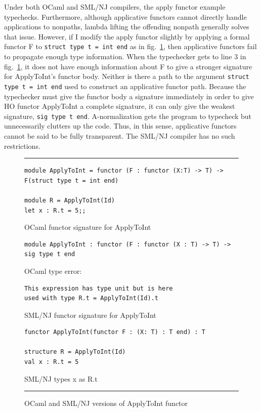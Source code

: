 Under both OCaml and SML/NJ compilers, the apply functor example typechecks. Furthermore, although applicative functors cannot directly handle applications to nonpaths, lambda lifting the offending nonpath generally solves that issue. However, if I modify the apply functor slightly by applying a formal functor F to \lstinline{struct type t = int end} as in fig.~\ref{fig:hoapplyfct}, then applicative functors fail to propagate enough type information. When the typechecker gets to line 3 in fig.~\ref{fig:hoapplyfct}, it does not have enough information about F to give a stronger signature for ApplyToInt's functor body. Neither is there a path to the argument \lstinline{struct type t = int end} used to construct an applicative functor path. Because the typechecker must give the functor body a signature immediately in order to give HO functor ApplyToInt a complete signature, it can only give the weakest signature, \lstinline{sig type t end}. A-normalization gets the program to typecheck but unnecessarily clutters up the code. Thus, in this sense, applicative functors cannot be said to be fully transparent. The SML/NJ compiler has no such restrictions.

\begin{figure}
\hrule
\begin{lstlisting}[style=ocamlcode]
module ApplyToInt = functor (F : functor (X:T) -> T) -> F(struct type t = int end)

module R = ApplyToInt(Id)
let x : R.t = 5;;
\end{lstlisting}

OCaml functor signature for ApplyToInt
\begin{lstlisting}
module ApplyToInt : functor (F : functor (X : T) -> T) -> sig type t end
\end{lstlisting}
OCaml type error:
\begin{verbatim}
This expression has type unit but is here 
used with type R.t = ApplyToInt(Id).t
\end{verbatim}
SML/NJ functor signature for ApplyToInt
\begin{lstlisting}
functor ApplyToInt(functor F : (X: T) : T end) : T

structure R = ApplyToInt(Id)
val x : R.t = 5
\end{lstlisting}
SML/NJ types x as R.t 
\hrule
\caption{OCaml and SML/NJ versions of ApplyToInt functor}
\label{fig:hoapplyfct}
\end{figure}

